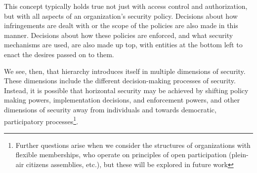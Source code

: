 This concept typically holds true not just with access control and
authorization, but with all aspects of an organization's security policy.
Decisions about how infringements are dealt with or the scope of the policies
are also made in this manner. Decisions about how these policies are enforced,
and what security mechanisms are used, are also made up top, with entities at
the bottom left to enact the desires passed on to them.

We see, then, that hierarchy introduces itself in multiple dimensions of
security. These dimensions include the different decision-making processes of
security. Instead, it is possible that horizontal security may be achieved by
shifting policy making powers, implementation decisions, and enforcement
powers, and other dimensions of security away from individuals and towards
democratic, participatory processes\footnote{Further questions arise when we
consider the structures of organizations with flexible memberships, who operate
on principles of open participation (plein-air citizens assemblies, etc.), but
these will be explored in future work}.

%
%
%

